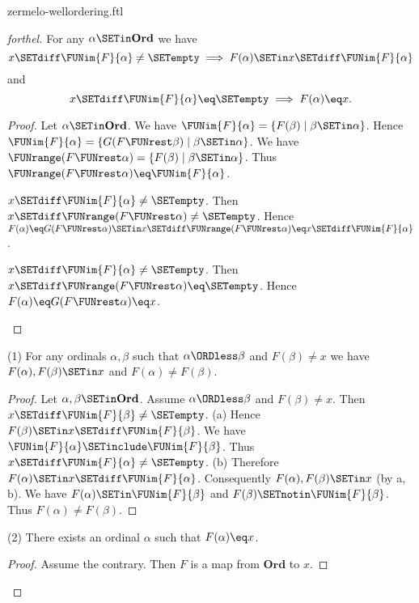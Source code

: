 \documentclass{stex}
\newcommand\Ord{\textbf{Ord}}
\begin{document}
\begin{smodule}{zermelo-wellordering.ftl}
\begin{proof}[forthel]
  For any $\alpha \SETin \Ord$ we have
  \[ x \SETdiff \FUNim{F}{\alpha} \neq \SETempty \implies F(\alpha) \SETin x \SETdiff \FUNim{F}{\alpha} \]
  and
  \[ x \SETdiff \FUNim{F}{\alpha} \eq \SETempty \implies F(\alpha) \eq x. \]
  \begin{proof}
    Let $\alpha \SETin \Ord$.
    We have $\FUNim{F}{\alpha} = \{ F(\beta) \mid \beta \SETin \alpha \}$.
    Hence $\FUNim{F}{\alpha} = \{ G(F \FUNrest \beta) \mid \beta \SETin \alpha \}$.
    We have $\FUNrange(F \FUNrest \alpha) = \{ F(\beta) \mid \beta \SETin \alpha \}$.
    Thus $\FUNrange(F \FUNrest \alpha) \eq \FUNim{F}{\alpha}$.

    \begin{case}{$x \SETdiff \FUNim{F}{\alpha} \neq \SETempty$.}
      Then $x \SETdiff \FUNrange(F \FUNrest \alpha) \neq \SETempty$.
      Hence $F(\alpha)
        \eq G(F \FUNrest \alpha)
        \SETin x \SETdiff \FUNrange(F \FUNrest \alpha)
        \eq x \SETdiff \FUNim{F}{\alpha}$.
    \end{case}

    \begin{case}{$x \SETdiff \FUNim{F}{\alpha} \neq \SETempty$.}
      Then $x \SETdiff \FUNrange(F \FUNrest \alpha) \eq \SETempty$.
      Hence $F(\alpha)
        \eq G(F \FUNrest \alpha)
        \eq x$.
    \end{case}
  \end{proof}

  (1) For any ordinals $\alpha, \beta$ such that $\alpha \ORDless \beta$ and $F(\beta) \neq x$ we have $F(\alpha), F(\beta) \SETin x$ and $F(\alpha) \neq F(\beta)$.
  \begin{proof}
    Let $\alpha, \beta \SETin \Ord$.
    Assume $\alpha \ORDless \beta$ and $F(\beta) \neq x$.
    Then $x \SETdiff \FUNim{F}{\beta} \neq \SETempty$.
    (a) Hence $F(\beta) \SETin x \SETdiff \FUNim{F}{\beta}$.
    We have $\FUNim{F}{\alpha} \SETinclude \FUNim{F}{\beta}$.
    Thus $x \SETdiff \FUNim{F}{\alpha} \neq \SETempty$.
    (b) Therefore $F(\alpha) \SETin x \SETdiff \FUNim{F}{\alpha}$.
    Consequently $F(\alpha), F(\beta) \SETin x$ (by a, b).
    We have $F(\alpha) \SETin \FUNim{F}{\beta}$ and $F(\beta) \SETnotin \FUNim{F}{\beta}$.
    Thus $F(\alpha) \neq F(\beta)$.
  \end{proof}

  (2) There exists an ordinal $\alpha$ such that $F(\alpha) \eq x$.
  \begin{proof}
    Assume the contrary.
    Then $F$ is a map from $\Ord$ to $x$.


\end{proof}
\end{proof}
\end{smodule}
\end{document}
